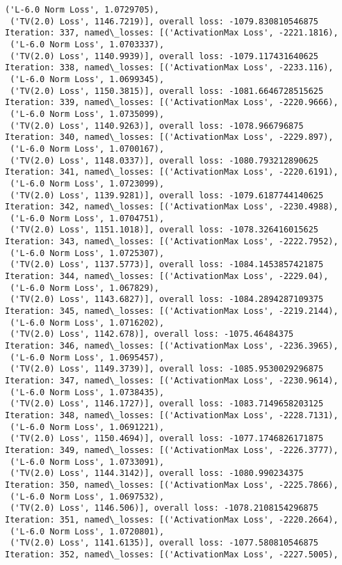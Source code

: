 \documentclass[10pt]{article}
\begin{document}
\begin{Verbatim}[commandchars=\\\{\}]
 ('L-6.0 Norm Loss', 1.0729705),
 ('TV(2.0) Loss', 1146.7219)], overall loss: -1079.830810546875
Iteration: 337, named\_losses: [('ActivationMax Loss', -2221.1816),
 ('L-6.0 Norm Loss', 1.0703337),
 ('TV(2.0) Loss', 1140.9939)], overall loss: -1079.117431640625
Iteration: 338, named\_losses: [('ActivationMax Loss', -2233.116),
 ('L-6.0 Norm Loss', 1.0699345),
 ('TV(2.0) Loss', 1150.3815)], overall loss: -1081.6646728515625
Iteration: 339, named\_losses: [('ActivationMax Loss', -2220.9666),
 ('L-6.0 Norm Loss', 1.0735099),
 ('TV(2.0) Loss', 1140.9263)], overall loss: -1078.966796875
Iteration: 340, named\_losses: [('ActivationMax Loss', -2229.897),
 ('L-6.0 Norm Loss', 1.0700167),
 ('TV(2.0) Loss', 1148.0337)], overall loss: -1080.793212890625
Iteration: 341, named\_losses: [('ActivationMax Loss', -2220.6191),
 ('L-6.0 Norm Loss', 1.0723099),
 ('TV(2.0) Loss', 1139.9281)], overall loss: -1079.6187744140625
Iteration: 342, named\_losses: [('ActivationMax Loss', -2230.4988),
 ('L-6.0 Norm Loss', 1.0704751),
 ('TV(2.0) Loss', 1151.1018)], overall loss: -1078.326416015625
Iteration: 343, named\_losses: [('ActivationMax Loss', -2222.7952),
 ('L-6.0 Norm Loss', 1.0725307),
 ('TV(2.0) Loss', 1137.5773)], overall loss: -1084.1453857421875
Iteration: 344, named\_losses: [('ActivationMax Loss', -2229.04),
 ('L-6.0 Norm Loss', 1.067829),
 ('TV(2.0) Loss', 1143.6827)], overall loss: -1084.2894287109375
Iteration: 345, named\_losses: [('ActivationMax Loss', -2219.2144),
 ('L-6.0 Norm Loss', 1.0716202),
 ('TV(2.0) Loss', 1142.678)], overall loss: -1075.46484375
Iteration: 346, named\_losses: [('ActivationMax Loss', -2236.3965),
 ('L-6.0 Norm Loss', 1.0695457),
 ('TV(2.0) Loss', 1149.3739)], overall loss: -1085.9530029296875
Iteration: 347, named\_losses: [('ActivationMax Loss', -2230.9614),
 ('L-6.0 Norm Loss', 1.0738435),
 ('TV(2.0) Loss', 1146.1727)], overall loss: -1083.7149658203125
Iteration: 348, named\_losses: [('ActivationMax Loss', -2228.7131),
 ('L-6.0 Norm Loss', 1.0691221),
 ('TV(2.0) Loss', 1150.4694)], overall loss: -1077.1746826171875
Iteration: 349, named\_losses: [('ActivationMax Loss', -2226.3777),
 ('L-6.0 Norm Loss', 1.0733091),
 ('TV(2.0) Loss', 1144.3142)], overall loss: -1080.990234375
Iteration: 350, named\_losses: [('ActivationMax Loss', -2225.7866),
 ('L-6.0 Norm Loss', 1.0697532),
 ('TV(2.0) Loss', 1146.506)], overall loss: -1078.2108154296875
Iteration: 351, named\_losses: [('ActivationMax Loss', -2220.2664),
 ('L-6.0 Norm Loss', 1.0720801),
 ('TV(2.0) Loss', 1141.6135)], overall loss: -1077.580810546875
Iteration: 352, named\_losses: [('ActivationMax Loss', -2227.5005),

\end{Verbatim}
\end{document}
